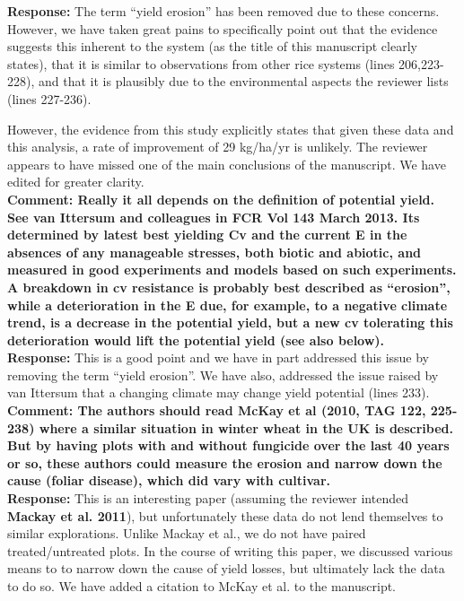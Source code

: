 \documentclass{article} \usepackage[margin=1in]{geometry}
\begin{document}
\textbf{Response:} The term ``yield erosion'' has been removed due to
these concerns. However, we have taken great pains to specifically
point out that the evidence suggests this inherent to the system (as
the title of this manuscript clearly states), that it is similar to
observations from other rice systems (lines 206,223-228), and that it is
plausibly due to the environmental aspects the reviewer lists (lines
227-236).

However, the evidence from this study explicitly states that given
these data and this analysis, a rate of improvement of 29 kg/ha/yr is
unlikely. The reviewer appears to have missed one of the main
conclusions of the manuscript. We have edited for greater clarity. \\

\textbf{Comment: Really it all depends on the definition of potential
  yield. See van Ittersum and colleagues in FCR Vol 143 March
  2013. Its determined by latest best yielding Cv and the current E in
  the absences of any manageable stresses, both biotic and abiotic,
  and measured in good experiments and models based on such
  experiments. A breakdown in cv resistance is probably best described
  as “erosion”, while a deterioration in the E due, for example, to a
  negative climate trend, is a decrease in the potential yield, but a
  new cv tolerating this deterioration would lift the potential yield
  (see also below).}\\

\textbf{Response:} This is a good point and we have in part addressed
this issue by removing the term “yield erosion”. We have also,
addressed the issue raised by van Ittersum that a changing climate may
change yield potential (lines 233).\\

\textbf{Comment: The authors should read McKay et al (2010, TAG 122,
  225-238) where a similar situation in winter wheat in the UK is
  described. But by having plots with and without fungicide over the
  last 40 years or so, these authors could measure the erosion and
  narrow down the cause (foliar disease), which did vary with
  cultivar.}\\

\textbf{Response:} This is an interesting paper (assuming the reviewer
intended \textbf{Mackay et al. 2011}), but unfortunately these data do
not lend themselves to similar explorations. Unlike Mackay et al., we
do not have paired treated/untreated plots. In the course of writing
this paper, we discussed various means to to narrow down the cause of
yield losses, but ultimately lack the data to do so. We have added a
citation to McKay et al. to the manuscript.\\
\end{document}
